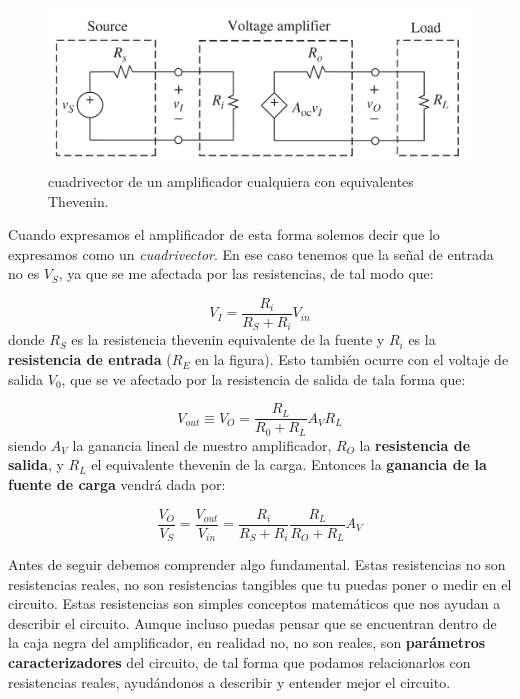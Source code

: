 \documentclass[12pt,a4paper]{article}
\numberwithin{equation}{section}
\numberwithin{figure}{section}
\begin{document}
\begin{figure}[h!] \centering
\includegraphics[scale=0.35]{1.1-Cuadrivector.png}
\caption{cuadrivector de un amplificador cualquiera con equivalentes Thevenin.}
\label{Fig:1.1-Cuadrivector}
\end{figure}

Cuando expresamos el amplificador de esta forma solemos decir que lo expresamos como un \textit{cuadrivector}. En ese caso tenemos que la señal de entrada no es $V_S$, ya que se me afectada por las resistencias, de tal modo que:

\begin{equation}
 V_I = \dfrac{R_i}{R_S + R_i} V_{in}
\end{equation}
donde $R_S$ es la resistencia thevenin equivalente de la fuente y $R_i$ es la \textbf{resistencia de entrada} ($R_E$ en la figura). Esto también ocurre con el voltaje de salida $V_0$, que se ve afectado por la resistencia de salida de tala forma que:

\begin{equation}
V_{out} \equiv V_O = \dfrac{R_L}{R_0 + R_L} A_V R_L
\end{equation}
siendo $A_V$ la ganancia lineal de nuestro amplificador, $R_O$ la \textbf{resistencia de salida}, y $R_L$ el equivalente thevenin de la carga. Entonces la \textbf{ganancia de la fuente de carga} vendrá dada por:

\begin{equation}
\dfrac{V_O}{V_S} = \dfrac{V_{out}}{V_{in}} = \dfrac{R_{i}}{R_S + R_i} \dfrac{R_L}{R_O + R_L} A_V
\end{equation}

Antes de seguir debemos comprender algo fundamental. Estas resistencias no son resistencias reales, no son resistencias tangibles que tu puedas poner o medir en el circuito. Estas resistencias son simples conceptos matemáticos que nos ayudan a describir el circuito. Aunque incluso puedas pensar que se encuentran dentro de la caja negra del amplificador, en realidad no, no son reales, son \textbf{parámetros caracterizadores} del circuito, de tal forma que podamos relacionarlos con resistencias reales, ayudándonos a describir y entender mejor el circuito. \\
\end{document}

